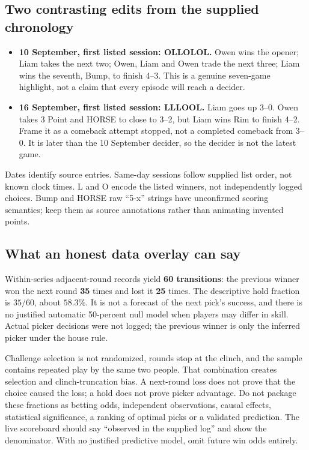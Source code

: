 \documentclass[11pt]{article}
\begin{document}
\subsection{Two contrasting edits from the supplied chronology}
\begin{itemize}
\item \textbf{10 September, first listed session: OLLOLOL.} Owen wins the
opener; Liam takes the next two; Owen, Liam and Owen trade the next three;
Liam wins the seventh, Bump, to finish 4--3. This is a genuine seven-game
highlight, not a claim that every episode will reach a decider.
\item \textbf{16 September, first listed session: LLLOOL.} Liam goes up 3--0.
Owen takes 3 Point and HORSE to close to 3--2, but Liam wins Rim to finish 4--2.
Frame it as a comeback attempt stopped, not a completed comeback from 3--0.
It is later than the 10 September decider, so the decider is not the latest game.
\end{itemize}

Dates identify source entries. Same-day sessions follow supplied list order,
not known clock times. L and O encode the listed winners, not independently
logged choices. Bump and HORSE raw ``5-x'' strings have unconfirmed scoring
semantics; keep them as source annotations rather than animating invented points.

\subsection{What an honest data overlay can say}
Within-series adjacent-round records yield \textbf{60 transitions}: the previous
winner won the next round \textbf{35} times and lost it \textbf{25} times.
The descriptive hold fraction is $35/60$, about $58.3\%$. It is not a forecast
of the next pick's success, and there is no justified automatic 50-percent null
model when players may differ in skill. Actual picker decisions were not logged;
the previous winner is only the inferred picker under the house rule.

Challenge selection is not randomized, rounds stop at the clinch, and the sample
contains repeated play by the same two people. That combination creates
selection and clinch-truncation bias. A next-round loss does not prove that the
choice caused the loss; a hold does not prove picker advantage. Do not package
these fractions as betting odds, independent observations, causal effects,
statistical significance, a ranking of optimal picks or a validated prediction.
The live scoreboard should say ``observed in the supplied log'' and show the
denominator. With no justified predictive model, omit future win odds entirely.
\end{document}
